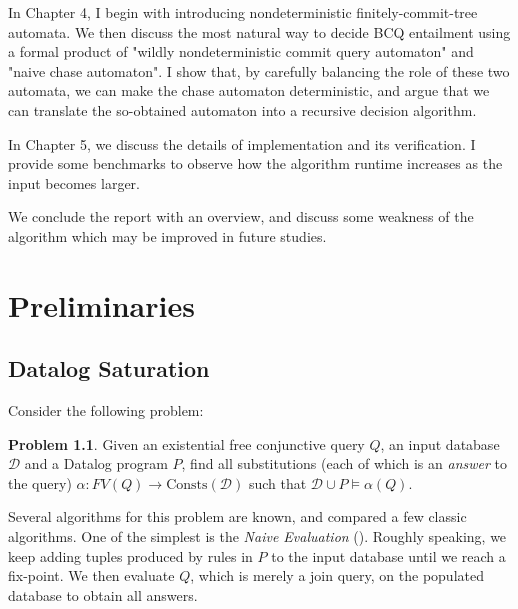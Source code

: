 \documentclass[12pt]{report}
\theoremstyle{plain}
\theoremstyle{definition}
\newtheorem{problem}[theorem]{Problem}
\def\Consts{{\mathrm{Consts}}}
\begin{document}
In Chapter 4, I begin with introducing nondeterministic finitely-commit-tree automata. We then discuss the most natural way to decide BCQ entailment using a formal product of "wildly nondeterministic commit query automaton" and "naive chase automaton". I show that, by carefully balancing the role of these two automata, we can make the chase automaton deterministic, and argue that we can translate the so-obtained automaton into a recursive decision algorithm.

In Chapter 5, we discuss the details of implementation and its verification. I provide some benchmarks to observe how the algorithm runtime increases as the input becomes larger.

We conclude the report with an overview, and discuss some weakness of the algorithm which may be improved in future studies.

\newpage
\chapter{Preliminaries}


\section{Datalog Saturation}

Consider the following problem:

\begin{problem}
   Given an existential free conjunctive query $Q$, an input database $\mathcal{D}$ and a Datalog program $P$, find all substitutions (each of which is an \emph{answer} to the query) $\alpha: FV(Q) \rightarrow \Consts(\mathcal{D})$ such that $\mathcal{D} \cup P \models \alpha(Q)$.
\end{problem}

Several algorithms for this problem are known, and \cite{bancilhon_ramakrishnan_1986} compared a few classic algorithms. One of the simplest is the \emph{Naive Evaluation} (). Roughly speaking, we keep adding tuples produced by rules in $P$ to the input database until we reach a fix-point. We then evaluate $Q$, which is merely a join query, on the populated database to obtain all answers.
\end{document}
